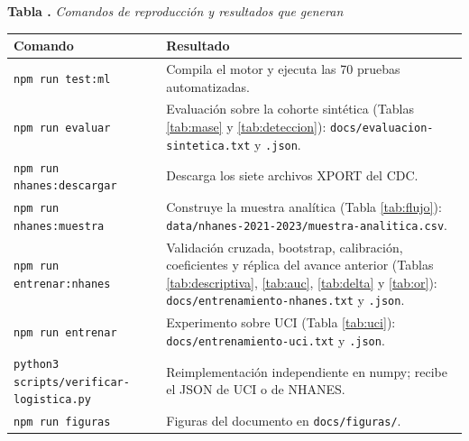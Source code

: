 \documentclass[12pt,letterpaper]{article}
\newcounter{tablaapa}
\newcommand{\tablaAPA}[2]{\refstepcounter{tablaapa}\label{#1}%
  \noindent\textbf{Tabla \thetablaapa.} \textit{#2}\par\vspace{0.2cm}}
\begin{document}
\begin{table}[!htbp]
\tablaAPA{tab:reproducir}{Comandos de reproducción y resultados que generan}
\small
\noindent\begin{tabularx}{\linewidth}{P{5.2cm}L}
\hline
\textbf{Comando} & \textbf{Resultado} \\
\hline
\texttt{npm run test:ml} & Compila el motor y ejecuta las 70 pruebas automatizadas. \\
\texttt{npm run evaluar} & Evaluación sobre la cohorte sintética (Tablas \ref{tab:mase} y \ref{tab:deteccion}): \texttt{docs/evaluacion-sintetica.txt} y \texttt{.json}. \\
\texttt{npm run nhanes:descargar} & Descarga los siete archivos XPORT del CDC. \\
\texttt{npm run nhanes:muestra} & Construye la muestra analítica (Tabla \ref{tab:flujo}): \texttt{data/nhanes-2021-2023/muestra-analitica.csv}. \\
\texttt{npm run entrenar:nhanes} & Validación cruzada, bootstrap, calibración, coeficientes y réplica del avance anterior (Tablas \ref{tab:descriptiva}, \ref{tab:auc}, \ref{tab:delta} y \ref{tab:or}): \texttt{docs/entrenamiento-nhanes.txt} y \texttt{.json}. \\
\texttt{npm run entrenar} & Experimento sobre UCI (Tabla \ref{tab:uci}): \texttt{docs/entrenamiento-uci.txt} y \texttt{.json}. \\
\texttt{python3 scripts/}\newline\texttt{verificar-logistica.py} & Reimplementación independiente en numpy; recibe el JSON de UCI o de NHANES. \\
\texttt{npm run figuras} & Figuras del documento en \texttt{docs/figuras/}. \\
\hline
\end{tabularx}
\end{table}
\end{document}
